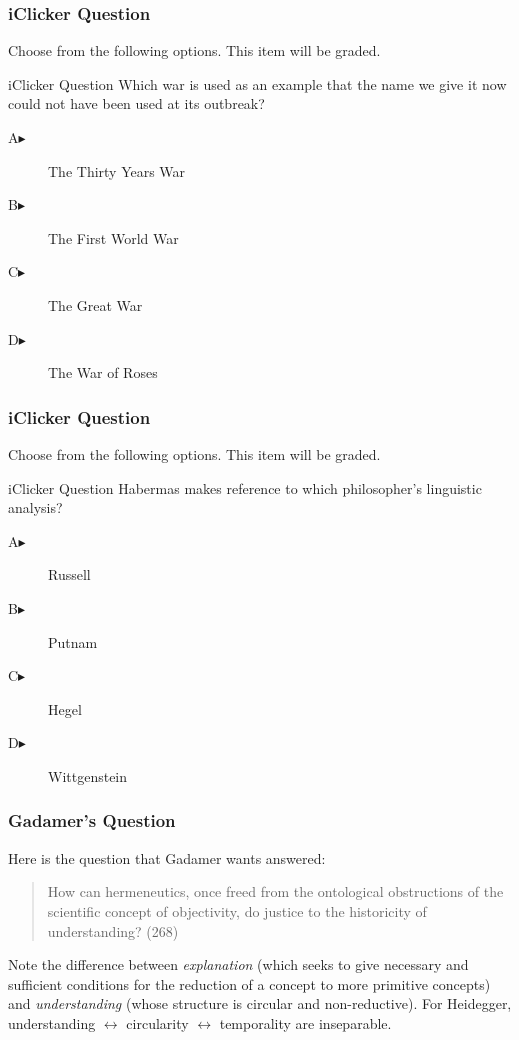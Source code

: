 \documentclass[xcolor=dvipsnames]{beamer}
\begin{document}
\begin{frame}
  \frametitle{iClicker Question}
Choose from the following options. This item will be graded.
\begin{block}{iClicker Question}
Which war is used as an example that the name we give it now could
not have been used at its outbreak?
\end{block}
\begin{description}
\item[A\hspace{.2in}$\blacktriangleright$] The Thirty Years War
\item[B\hspace{.2in}$\blacktriangleright$] The First World War
\item[C\hspace{.2in}$\blacktriangleright$] The Great War
\item[D\hspace{.2in}$\blacktriangleright$] The War of Roses
\end{description}
\end{frame}

\begin{frame}
  \frametitle{iClicker Question}
Choose from the following options. This item will be graded.
\begin{block}{iClicker Question}
Habermas makes reference to which philosopher's linguistic analysis?
\end{block}
\begin{description}
\item[A\hspace{.2in}$\blacktriangleright$] Russell
\item[B\hspace{.2in}$\blacktriangleright$] Putnam
\item[C\hspace{.2in}$\blacktriangleright$] Hegel
\item[D\hspace{.2in}$\blacktriangleright$] Wittgenstein
\end{description}
\end{frame}

\begin{frame}
  \frametitle{Gadamer's Question}
Here is the question that Gadamer wants answered:
\begin{quote}
  How can hermeneutics, once freed from the ontological obstructions
  of the scientific concept of objectivity, do justice to the
  historicity of understanding? (268)
\end{quote}
Note the difference between \emph{explanation} (which seeks to give
necessary and sufficient conditions for the reduction of a concept to
more primitive concepts) and \emph{understanding} (whose structure is
circular and non-reductive). For Heidegger, understanding
$\leftrightarrow$ circularity $\leftrightarrow$ temporality are
inseparable.
\end{frame}
\end{document}
